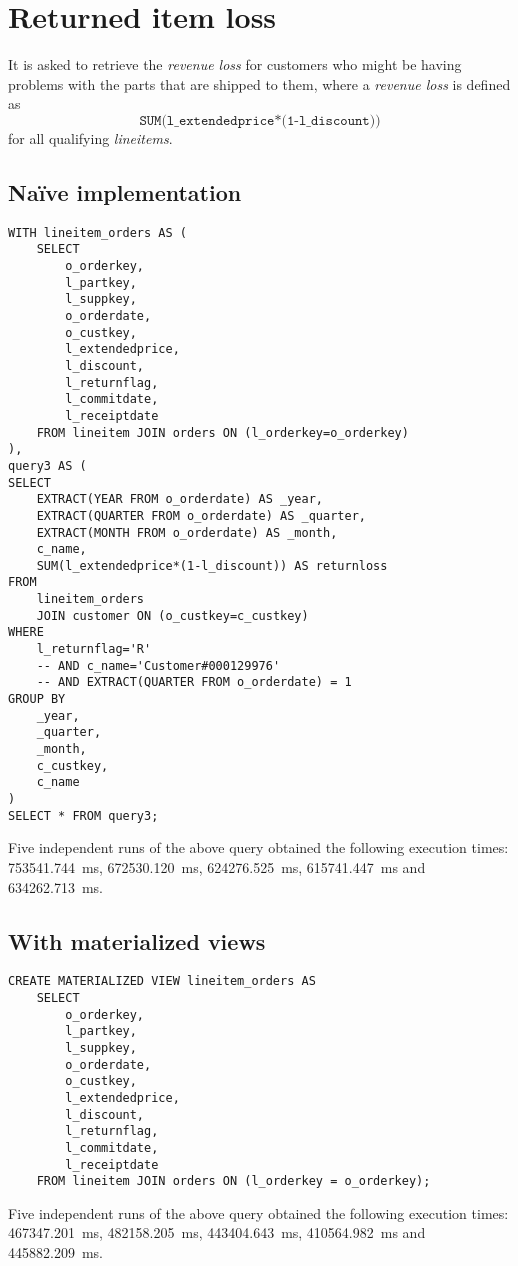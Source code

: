 

\section{Returned item loss}

It is asked to retrieve the \textit{revenue loss} for customers who might be having problems with the parts that are shipped to them, where a \textit{revenue loss} is defined as
$$ \texttt{SUM(l\_extendedprice*(1-l\_discount))}$$
for all qualifying \textit{lineitems}.

\subsection{Na\"{i}ve implementation}

\begin{lstlisting}
WITH lineitem_orders AS (
	SELECT 
		o_orderkey, 
		l_partkey, 
		l_suppkey, 
		o_orderdate, 
		o_custkey, 
		l_extendedprice, 
		l_discount, 
		l_returnflag,
		l_commitdate,
		l_receiptdate
	FROM lineitem JOIN orders ON (l_orderkey=o_orderkey)
),
query3 AS (
SELECT
	EXTRACT(YEAR FROM o_orderdate) AS _year,
	EXTRACT(QUARTER FROM o_orderdate) AS _quarter,
	EXTRACT(MONTH FROM o_orderdate) AS _month,
	c_name,
	SUM(l_extendedprice*(1-l_discount)) AS returnloss
FROM
	lineitem_orders
	JOIN customer ON (o_custkey=c_custkey)
WHERE 
	l_returnflag='R'
	-- AND c_name='Customer#000129976'
	-- AND EXTRACT(QUARTER FROM o_orderdate) = 1
GROUP BY
	_year,
	_quarter,
	_month,
	c_custkey,
	c_name
)
SELECT * FROM query3;
\end{lstlisting}

Five independent runs of the above query obtained the following execution times: \SI{753541.744}{\milli\s}, \SI{672530.120}{\milli\s}, \SI{624276.525}{\milli\s}, \SI{615741.447}{\milli\s} and \SI{634262.713}{\milli\s}.

\subsection{With materialized views}

\begin{lstlisting}
CREATE MATERIALIZED VIEW lineitem_orders AS
	SELECT 
		o_orderkey, 
		l_partkey, 
		l_suppkey, 
		o_orderdate, 
		o_custkey, 
		l_extendedprice, 
		l_discount, 
		l_returnflag,
		l_commitdate,
		l_receiptdate
	FROM lineitem JOIN orders ON (l_orderkey = o_orderkey);
\end{lstlisting}

Five independent runs of the above query obtained the following execution times: \SI{467347.201}{\milli\s}, \SI{482158.205}{\milli\s}, \SI{443404.643}{\milli\s}, \SI{410564.982}{\milli\s} and \SI{445882.209}{\milli\s}.

